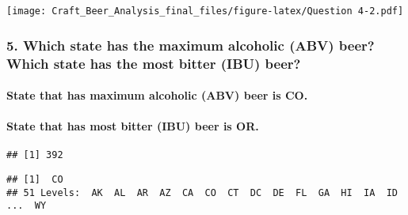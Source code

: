\documentclass[]{article}
\newenvironment{Shaded}{\begin{snugshade}}{\end{snugshade}}
\newcommand{\KeywordTok}[1]{\textcolor[rgb]{0.13,0.29,0.53}{\textbf{{#1}}}}
\newcommand{\DataTypeTok}[1]{\textcolor[rgb]{0.13,0.29,0.53}{{#1}}}
\newcommand{\StringTok}[1]{\textcolor[rgb]{0.31,0.60,0.02}{{#1}}}
\newcommand{\OtherTok}[1]{\textcolor[rgb]{0.56,0.35,0.01}{{#1}}}
\newcommand{\NormalTok}[1]{{#1}}
\let\oldparagraph\paragraph
\renewcommand{\paragraph}[1]{\oldparagraph{#1}\mbox{}}
\begin{document}
\texttt{[image: Craft\_Beer\_Analysis\_final\_files/figure-latex/Question 4-2.pdf]}

\subsubsection{5. Which state has the maximum alcoholic (ABV) beer?
Which state has the most bitter (IBU)
beer?}\label{which-state-has-the-maximum-alcoholic-abv-beer-which-state-has-the-most-bitter-ibu-beer}

\paragraph{State that has maximum alcoholic (ABV) beer is
CO.}\label{state-that-has-maximum-alcoholic-abv-beer-is-co.}

\paragraph{State that has most bitter (IBU) beer is
OR.}\label{state-that-has-most-bitter-ibu-beer-is-or.}

\begin{Shaded}
\end{Shaded}

\begin{verbatim}
## [1] 392
\end{verbatim}

\begin{Shaded}
\end{Shaded}

\begin{verbatim}
## [1]  CO
## 51 Levels:  AK  AL  AR  AZ  CA  CO  CT  DC  DE  FL  GA  HI  IA  ID ...  WY
\end{verbatim}

\begin{Shaded}
\end{Shaded}
\end{document}
